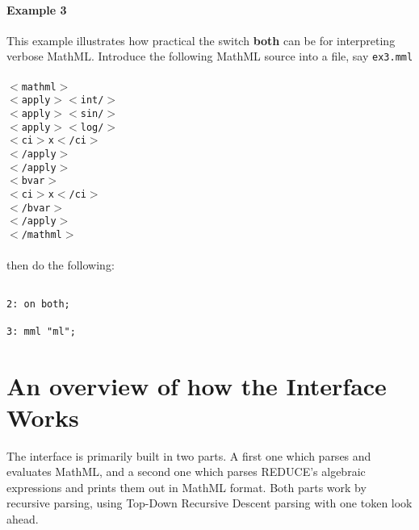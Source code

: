 \documentclass{article}
\begin{document}
\paragraph{Example 3} This example illustrates how practical the switch
{\bf both} can be for interpreting verbose MathML.
Introduce the following MathML source into a file, say {\tt ex3.mml}\\
\\
{\tt $<$mathml$>$\\
\hspace*{1mm}  $<$apply$>$$<$int/$>$\\
\hspace*{5mm}    $<$apply$>$$<$sin/$>$\\
\hspace*{9mm}      $<$apply$>$$<$log/$>$\\
\hspace*{13mm}       $<$ci$>$x$<$/ci$>$\\
\hspace*{9mm}      $<$/apply$>$\\
\hspace*{5mm}    $<$/apply$>$\\
\hspace*{5mm}    $<$bvar$>$\\
\hspace*{9mm}      $<$ci$>$x$<$/ci$>$\\
\hspace*{5mm}    $<$/bvar$>$\\
\hspace*{1mm}  $<$/apply$>$\\
$<$/mathml$>$ \\}
\\
then do the following:

\begin{verbatim}

2: on both;

3: mml "ml";

\end{verbatim}

\section{An overview of how the Interface Works}

The interface is primarily built in two parts. A first one which parses
and evaluates MathML, and a second one which parses REDUCE's algebraic
expressions and prints them out in MathML format. Both parts work by
recursive parsing, using Top-Down Recursive Descent parsing with one token
look ahead.
\end{document}
